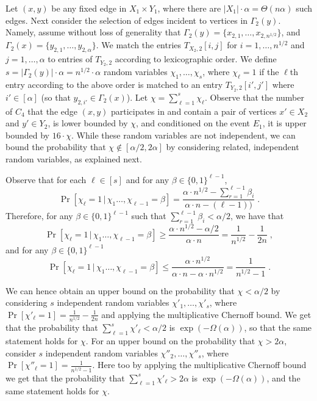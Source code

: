 \documentclass{article}
\newcommand{\commentt}[1]{ {}}
\begin{document}
Let $(x,y)$ be any fixed edge in $X_1\times Y_1$, where there are $|X_1| \cdot \alpha = \Theta(n\alpha)$ such edges.
Next consider the selection of edges incident to vertices in $\Gamma_2(y)$. Namely, assume without loss of generality that $\Gamma_2(y) = \{x_{2,1},\dots,x_{2,n^{1/2}}\}$, and $\Gamma_2(x) = \{y_{2,1},\dots,y_{2,\alpha}\}$. We match the entries $T_{X_2,2}[i,j]$ for $i=1,\dots,n^{1/2}$ and $j=1,\dots,\alpha$ to entries of $T_{Y_2,2}$ according to lexicographic order.
We define $s=|\Gamma_2(y)|\cdot \alpha = n^{1/2}\cdot \alpha$ random variables $\chi_1,\dots,\chi_s$, where $\chi_\ell = 1$ if the $\ell$th entry according to the above order is matched to an entry $T_{Y_2,2}[i',j']$ where $i'\in [\alpha]$ (so that $y_{2,i'}\in \Gamma_2(x)$). Let $\chi = \sum_{\ell=1}^s \chi_\ell$.  Observe that the number of $C_4$ that the edge $(x,y)$ participates in and contain a pair of vertices $x' \in X_2$ and $y' \in Y_2$, is lower bounded by $\chi$, and conditioned on the event $E_1$, it is upper bounded by
$16\cdot \chi$. \commentt{DR: maybe need to elaborate a bit more.}
While these random variables are not independent, we can bound the probability that $\chi \notin [\alpha/2,2\alpha]$
by considering related, independent random variables, as explained next.

Observe that for each $\ell \in [s]$
and for any $\beta \in \{0,1\}^{\ell-1}$,
$$\Pr[\chi_\ell=1 \,|\, \chi_1\dots,\chi_{\ell-1}=\beta] =
       \frac{\alpha\cdot n^{1/2} - \sum_{r=1}^{\ell-1}\beta_i}{\alpha\cdot n - (\ell-1))}\;.$$
Therefore, for any $\beta \in \{0,1\}^{\ell-1}$ such that $\sum_{r=1}^{\ell-1}\beta_i < \alpha/2$, we have that
$$\Pr[\chi_\ell=1 \,|\, \chi_1\dots,\chi_{\ell-1}=\beta] \geq
           \frac{\alpha\cdot n^{1/2} - \alpha/2} {\alpha\cdot n } = \frac{1}{n^{1/2}}-\frac{1}{2n}\;,$$
and for any $\beta \in \{0,1\}^{\ell-1}$
$$\Pr[\chi_\ell=1 \,|\, \chi_1\dots,\chi_{\ell-1}=\beta] \leq
    \frac{\alpha\cdot n^{1/2}}{\alpha\cdot n - \alpha\cdot n^{1/2}} = \frac{1}{n^{1/2}-1}\;.$$

We can hence obtain an upper bound on the probability that $\chi < \alpha/2$ by considering $s$ independent random variables $\chi'_1,\dots,\chi'_s$, where $\Pr[\chi'_\ell=1] = \frac{1}{n^{1/2}}-\frac{1}{2n}$ and applying the multiplicative Chernoff bound. We get that the probability that $\sum_{\ell=1}^s \chi'_\ell < \alpha/2$ is $\exp(-\Omega(\alpha))$, so that the same statement holds for $\chi$. For an upper bound on the probability that $\chi > 2 \alpha$, consider $s$ independent random variables $\chi''_2,\dots,\chi''_s$, where $\Pr[\chi''_\ell=1] = \frac{1}{n^{1/2}-1}$. Here too by applying the multiplicative Chernoff bound we get that the probability that $\sum_{\ell=1}^s \chi'_\ell > 2\alpha$ is $\exp(-\Omega(\alpha))$, and the same statement holds for $\chi$.
\end{document}
